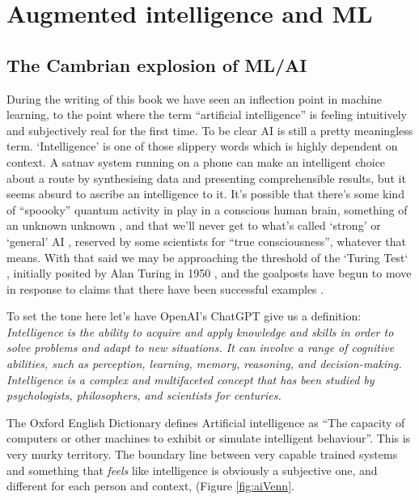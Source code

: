 \section{Augmented intelligence and ML}
\subsection{The Cambrian explosion of ML/AI}
During the writing of this book we have seen an inflection point in machine learning, to the point where the term ``artificial intelligence'' is feeling intuitively and subjectively real for the first time.  To be clear AI is still a pretty meaningless term. `Intelligence' is one of those slippery words which is highly dependent on context. A satnav system running on a phone can make an intelligent choice about a route by synthesising data and presenting comprehensible results, but it seems absurd to ascribe an intelligence to it. It's possible that there's some kind of ``spoooky'' quantum activity in play in a conscious human brain, something of an unknown unknown \cite{kerskens2022experimental}, and that we'll never get to what's called `strong' or `general' AI \cite{larson2021myth, searle1980minds}, reserved by some scientists for ``true consciousness'', whatever that means. With that said we may be approaching the threshold of the `Turing Test` \cite{sep-turing-test}, initially posited by Alan Turing in 1950 \cite{turing1950computing}, and the goalposts have begun to move in response to claims that there have been successful examples \cite{warwick2016can, french2012moving, french2000turing, searle2009turing}.\par
To set the tone here let's have OpenAI's ChatGPT give us a definition:
\textit{Intelligence is the ability to acquire and apply knowledge and skills in order to solve problems and adapt to new situations. It can involve a range of cognitive abilities, such as perception, learning, memory, reasoning, and decision-making. Intelligence is a complex and multifaceted concept that has been studied by psychologists, philosophers, and scientists for centuries.}\par
The Oxford English Dictionary defines Artificial intelligence as ``The capacity of computers or other machines to exhibit or simulate intelligent behaviour''. This is very murky territory. The boundary line between very capable trained systems and something that \textit{feels} like intelligence is obviously a subjective one, and different for each person and context, (Figure \ref{fig:aiVenn}.\par

